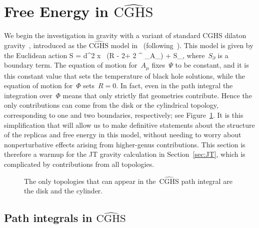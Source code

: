 \documentclass[12pt]{article}
\begin{document}
\section{Free Energy in $\widehat{\mathrm{CGHS}}$}
\label{sec:CGHS}

We begin the investigation in gravity with a variant of standard CGHS dilaton gravity~\cite{CGHS}, introduced as the $\widehat{\mathrm{CGHS}}$ model in~\cite{AfsGon19} (following~\cite{CanJac92}).  This model is given by the Euclidean action
\be
S =  \int d^2 x \,  \left(\Phi R - 2\Psi + 2 \Psi \varepsilon^{\mu\nu} \partial_\mu A_\nu\right) + S_\partial,
\ee
where~$S_\partial$ is a boundary term.  The equation of motion for~$A_\mu$ fixes~$\Psi$ to be constant, and it is this constant value that sets the temperature of black hole solutions, while the equation of motion for~$\Phi$ sets~$R = 0$.   In fact, even in the path integral the integration over~$\Phi$ means that only strictly flat geometries contribute.  Hence the only contributions can come from the disk or the cylindrical topology, corresponding to one and two boundaries, respectively; see Figure~\ref{fig:CGHS}.  It is this simplification that will allow us to make definitive statements about the structure of the replicas and free energy in this model, without needing to worry about nonperturbative effects arising from higher-genus contributions.  This section is therefore a warmup for the JT gravity calculation in Section~\ref{sec:JT}, which is complicated by contributions from all topologies.

\begin{figure}[t]
\centering
{}%
\hspace{3cm}
\caption{The only topologies that can appear in the~$\widehat{\mathrm{CGHS}}$ path integral are the disk and the cylinder.}
\label{fig:CGHS}
\end{figure}



\subsection{Path integrals in $\widehat{\mathrm{CGHS}}$}
\label{subsec:CGHSpathintegral}
\end{document}
